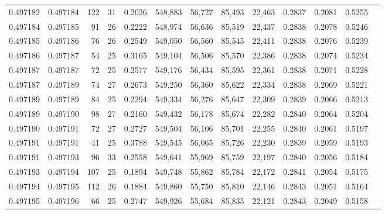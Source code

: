 \begin{tabular}{rrrrrrrrrrrrr}
0.497182 & 0.497184 & 122 &  31 &                                     0.2026 & 548,883 &  56,727 &  85,493 &  22,463 & 0.2837 & 0.2081 & 0.5255 \\
0.497184 & 0.497185 &  91 &  26 &                                     0.2222 & 548,974 &  56,636 &  85,519 &  22,437 & 0.2838 & 0.2078 & 0.5246 \\
0.497185 & 0.497186 &  76 &  26 &                                     0.2549 & 549,050 &  56,560 &  85,545 &  22,411 & 0.2838 & 0.2076 & 0.5239 \\
0.497186 & 0.497187 &  54 &  25 &                                     0.3165 & 549,104 &  56,506 &  85,570 &  22,386 & 0.2838 & 0.2074 & 0.5234 \\
0.497187 & 0.497187 &  72 &  25 &                                     0.2577 & 549,176 &  56,434 &  85,595 &  22,361 & 0.2838 & 0.2071 & 0.5228 \\
0.497187 & 0.497189 &  74 &  27 &                                     0.2673 & 549,250 &  56,360 &  85,622 &  22,334 & 0.2838 & 0.2069 & 0.5221 \\
0.497189 & 0.497189 &  84 &  25 &                                     0.2294 & 549,334 &  56,276 &  85,647 &  22,309 & 0.2839 & 0.2066 & 0.5213 \\
0.497189 & 0.497190 &  98 &  27 &                                     0.2160 & 549,432 &  56,178 &  85,674 &  22,282 & 0.2840 & 0.2064 & 0.5204 \\
0.497190 & 0.497191 &  72 &  27 &                                     0.2727 & 549,504 &  56,106 &  85,701 &  22,255 & 0.2840 & 0.2061 & 0.5197 \\
0.497191 & 0.497191 &  41 &  25 &                                     0.3788 & 549,545 &  56,065 &  85,726 &  22,230 & 0.2839 & 0.2059 & 0.5193 \\
0.497191 & 0.497193 &  96 &  33 &                                     0.2558 & 549,641 &  55,969 &  85,759 &  22,197 & 0.2840 & 0.2056 & 0.5184 \\
0.497193 & 0.497194 & 107 &  25 &                                     0.1894 & 549,748 &  55,862 &  85,784 &  22,172 & 0.2841 & 0.2054 & 0.5175 \\
0.497194 & 0.497195 & 112 &  26 &                                     0.1884 & 549,860 &  55,750 &  85,810 &  22,146 & 0.2843 & 0.2051 & 0.5164 \\
0.497195 & 0.497196 &  66 &  25 &                                     0.2747 & 549,926 &  55,684 &  85,835 &  22,121 & 0.2843 & 0.2049 & 0.5158 \\

\end{tabular}
